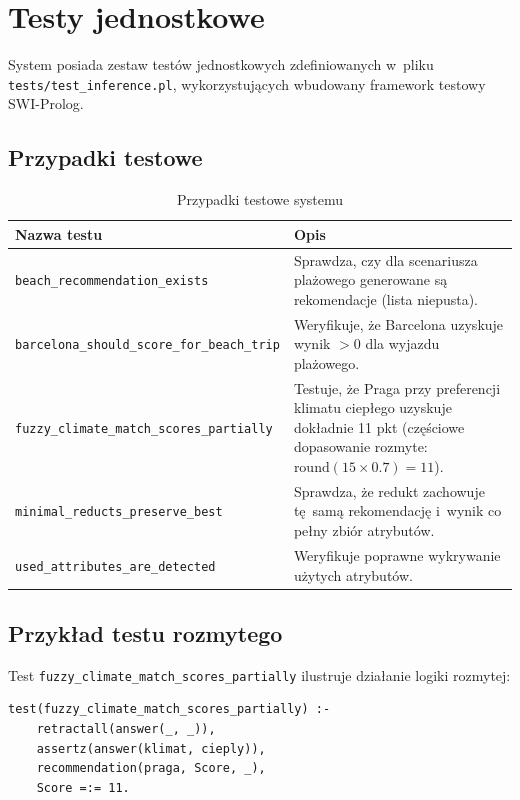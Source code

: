 \documentclass[12pt,a4paper]{article}
\begin{document}
\section{Testy jednostkowe}

System posiada zestaw testów jednostkowych zdefiniowanych w~pliku \texttt{tests/test\_inference.pl}, wykorzystujących wbudowany framework testowy SWI-Prolog.

\subsection{Przypadki testowe}

\begin{table}[H]
\centering
\small
\begin{tabularx}{\textwidth}{lX}
\toprule
\textbf{Nazwa testu} & \textbf{Opis} \\
\midrule
\texttt{beach\_recommendation\_exists} & Sprawdza, czy dla scenariusza plażowego generowane są rekomendacje (lista niepusta). \\
\texttt{barcelona\_should\_score\_for\_beach\_trip} & Weryfikuje, że Barcelona uzyskuje wynik $> 0$ dla wyjazdu plażowego. \\
\texttt{fuzzy\_climate\_match\_scores\_partially} & Testuje, że Praga przy preferencji klimatu ciepłego uzyskuje dokładnie 11 pkt (częściowe dopasowanie rozmyte: $\text{round}(15 \times 0.7) = 11$). \\
\texttt{minimal\_reducts\_preserve\_best} & Sprawdza, że redukt zachowuje tę~samą rekomendację i~wynik co pełny zbiór atrybutów. \\
\texttt{used\_attributes\_are\_detected} & Weryfikuje poprawne wykrywanie użytych atrybutów. \\
\bottomrule
\end{tabularx}
\caption{Przypadki testowe systemu}
\end{table}

\subsection{Przykład testu rozmytego}

Test \texttt{fuzzy\_climate\_match\_scores\_partially} ilustruje działanie logiki rozmytej:

\begin{lstlisting}[style=prolog, caption={Test częściowego dopasowania klimatu}]
test(fuzzy_climate_match_scores_partially) :-
    retractall(answer(_, _)),
    assertz(answer(klimat, cieply)),
    recommendation(praga, Score, _),
    Score =:= 11.
\end{lstlisting}
\end{document}
